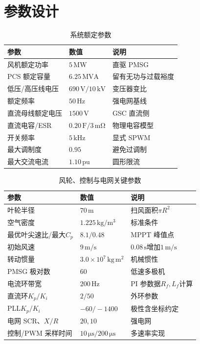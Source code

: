 \documentclass[UTF8,zihao=-4,fontset=fandol]{ctexrep}
\newcommand{\pu}{\mathrm{pu}}
\begin{document}
\chapter{参数设计}
\begin{table}[H]
\centering
\caption{系统额定参数}
\begin{tabular}{p{5.2cm}p{3.2cm}p{4.0cm}}
\toprule
参数 & 数值 & 说明\\
\midrule
风机额定功率 & \(5\,\mathrm{MW}\) & 直驱 PMSG\\
PCS 额定容量 & \(6.25\,\mathrm{MVA}\) & 留有无功与过载裕度\\
低压/高压线电压 & \(690\,\mathrm{V}/10\,\mathrm{kV}\) & 变压器变比\\
额定频率 & \(50\,\mathrm{Hz}\) & 强电网基线\\
直流母线额定电压 & \(1500\,\mathrm{V}\) & GSC 直流侧\\
直流电容/ESR & \(0.20\,\mathrm{F}/3\,\mathrm{m\Omega}\) & 物理电容模型\\
开关频率 & \(5\,\mathrm{kHz}\) & 显式 SPWM\\
最大调制度 & \(0.95\) & 避免过调制\\
最大交流电流 & \(1.10\,\pu\) & 圆形限流\\
\bottomrule
\end{tabular}
\end{table}

\begin{table}[H]
\centering
\caption{风轮、控制与电网关键参数}
\begin{tabular}{p{5.4cm}p{3.2cm}p{3.8cm}}
\toprule
参数 & 数值 & 说明\\
\midrule
叶轮半径 & \(70\,\mathrm{m}\) & 扫风面积\(\pi R^2\)\\
空气密度 & \(1.225\,\mathrm{kg/m^3}\) & 标准条件\\
最优叶尖速比/最大\(C_p\) & \(8.1/0.48\) & MPPT 峰值点\\
初始风速 & \(9\,\mathrm{m/s}\) & \(0.08\,\mathrm{s}\)增加\(1\,\mathrm{m/s}\)\\
转动惯量 & \(3.0\times10^7\,\mathrm{kg\,m^2}\) & 机械惯性\\
PMSG 极对数 & \(60\) & 低速多极机\\
电流环带宽 & \(200\,\mathrm{Hz}\) & PI 参数据\(R_f,L_f\)计算\\
直流环\(K_p/K_i\) & \(2/50\) & 外环参数\\
PLL\(K_p/K_i\) & \(-60/-1400\) & 极性含坐标约定\\
电网 SCR、\(X/R\) & \(20,10\) & 强电网\\
控制/PWM 采样时间 & \(10\,\mathrm{\mu s}/200\,\mathrm{\mu s}\) & 多速率实现\\
\bottomrule
\end{tabular}
\end{table}
\end{document}
